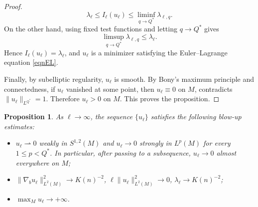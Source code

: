 \documentclass[11pt]{article}
\numberwithin{equation}{section}
\newtheorem{proposition}{Proposition}[section]
\numberwithin{equation}{section}
\begin{document}
\begin{proof}
		\[
		\lambda_\ell \le I_\ell(u_\ell) \le \liminf_{q\to Q^*}\lambda_{\ell,q}.
		\]
		On the other hand, using fixed test functions and letting \(q\to Q^*\) gives
		\[
		\limsup_{q\to Q^*}\lambda_{\ell,q} \leq \lambda_\ell.
		\]
		Hence \(I_\ell(u_\ell)=\lambda_\ell\), and \(u_\ell\) is a minimizer satisfying the Euler--Lagrange equation \eqref{eqnEL}.
		
		Finally, by subelliptic regularity, \(u_\ell\) is smooth. By Bony's maximum principle \cite{B1969} and connectedness, if \(u_\ell\) vanished at some point, then \(u_\ell\equiv0\) on \(M\), contradicts \(\|u_\ell\|_{L^{Q^*}}=1\). Therefore \(u_\ell>0\) on \(M\). This proves the proposition.
	\end{proof}
	
	\begin{proposition}\label{propblowup}
		As \(\ell\to\infty\), the sequence \(\{u_\ell\}\) satisfies the following blow-up estimates:
		\begin{itemize}
			\item[\textup{(1)}] \(u_\ell\rightharpoonup0\) weakly in \(S^{1,2}(M)\) and \(u_\ell\to0\) strongly in \(L^p(M)\) for every \(1\leq p<Q^*\). In particular, after passing to a subsequence, \(u_\ell\to0\) almost everywhere on \(M\);
			
			\item[\textup{(2)}]\(\|\nabla_bu_\ell\|_{L^2(M)}^2\to K(n)^{-2}\), \(\ell\|u_\ell\|_{L^2(M)}^2 \to 0\), \(\lambda_\ell\to K(n)^{-2}\);
			
			\item[\textup{(3)}] \(\max_M u_\ell\to+\infty\).
		\end{itemize}
	\end{proposition}
	
\end{document}
